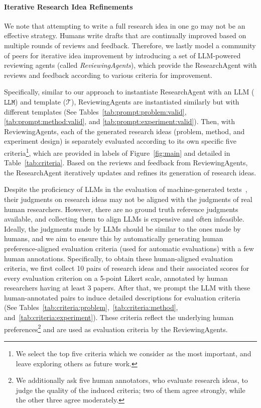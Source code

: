 \paragraph{Iterative Research Idea Refinements}
We note that attempting to write a full research idea in one go may not be an effective strategy. Humans write drafts that are continually improved based on multiple rounds of reviews and feedback. Therefore, we lastly model a community of peers for iterative idea improvement by introducing a set of LLM-powered reviewing agents (called \emph{ReviewingAgents}), which provide the ResearchAgent with reviews and feedback according to various criteria for improvement.

Specifically, similar to our approach to instantiate ResearchAgent with an LLM ($\texttt{LLM}$) and template ($\mathcal{T}$), ReviewingAgents are instantiated similarly but with different templates (See Tables~\ref{tab:prompt:problem:valid}, \ref{tab:prompt:method:valid}, and \ref{tab:prompt:experiment:valid}). Then, with ReviewingAgents, each of the generated research ideas (problem, method, and experiment design) is separately evaluated according to its own specific five criteria\footnote{We select the top five criteria which we consider as the most important, and leave exploring others as future work.}, which are provided in labels of Figure~\ref{fig:main} and detailed in Table~\ref{tab:criteria}. Based on the reviews and feedback from ReviewingAgents, the ResearchAgent iteratively updates and refines its generation of research ideas.

Despite the proficiency of LLMs in the evaluation of machine-generated texts~\cite{LLM/Judge/1, LLM/Judge/2}, their judgments on research ideas may not be aligned with the judgments of real human researchers. However, there are no ground truth reference judgments available, and collecting them to align LLMs is expensive and often infeasible. Ideally, the judgments made by LLMs should be similar to the ones made by humans, and we aim to ensure this by automatically generating human preference-aligned evaluation criteria (used for automatic evaluations) with a few human annotations. Specifically, to obtain these human-aligned evaluation criteria, we first collect 10 pairs of research ideas and their associated scores for every evaluation criterion on a 5-point Likert scale, annotated by human researchers having at least 3 papers. After that, we prompt the LLM with these human-annotated pairs to induce detailed descriptions for evaluation criteria~\cite{lin2024interpretable} (See Tables~\ref{tab:criteria:problem},~\ref{tab:criteria:method}, and~\ref{tab:criteria:experiment}). These criteria reflect the underlying human preferences\footnote{We additionally ask five human annotators, who evaluate research ideas, to judge the quality of the induced criteria; two of them agree strongly, while the other three agree moderately.} and are used as evaluation criteria by the ReviewingAgents.

